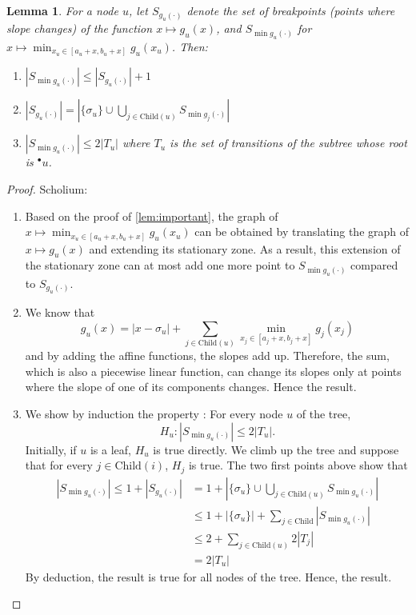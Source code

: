 \documentclass[conference]{IEEEtran}
\newtheorem{lemma}[theorem]{Lemma}
\begin{document}
\begin{lemma}\label{Encadrement}
For a node $u$, let $S_{g_{u}(\cdot)}$ denote the set of breakpoints (points where slope changes) of the function $x \mapsto g_{u}(x)$, and $S_{\min g_{u}(\cdot)}$ for $x \mapsto \min_{x_u \in [a_u+x, b_u+x]} g_{u}(x_u)$. Then:
\begin{enumerate}
    \item $|S_{\min g_{u}(\cdot)}| \leq |S_{g_{u}(\cdot)}|+1 $
    \item $|S_{g_{u}(\cdot)}| = |\{\sigma_u\}\cup \bigcup_{j\in\text{Child}(u)}S_{\min g_{j}(\cdot)}|$
    \item $|S_{\min g_{u}(\cdot)}| \leq 2|T_u|$ where $T_u$ is the set of transitions of the subtree whose root is ${}^\bullet u$.
\end{enumerate}
\end{lemma}

\begin{proof}
    Scholium:
    \begin{enumerate}
        \item Based on the proof of \autoref{lem:important}, the graph of 
        $x\mapsto\min_{x_u \in [a_u+x,b_u+x]}g_{u}(x_u)$ can be obtained by 
        translating the graph of $x\mapsto g_{u}(x)$ and extending its stationary 
        zone. As a result, this extension of the stationary zone can at most add 
        one more point to $S_{\min g_{u}(\cdot)}$ compared to $S_{g_{u}(\cdot)}$.
        \item We know that 
        \[g_{u}(x) = |x-\sigma_u| + \sum_{j\in \text{Child}(u)}\min_{x_j \in [a_j+x,b_j+x]}g_{j}(x_j)\] 
        and by adding the affine functions, the slopes add up. Therefore, the sum, 
        which is also a piecewise linear function, can change its slopes only at 
        points where the slope of one of its components changes. Hence the result.
        \item We show by induction the property : For every node $u$ of the 
        tree, \[H_u: |S_{\min g_{u}(\cdot)}| \leq 2|T_u|.\] 
        Initially, if $u$ is a leaf, $H_u$ is true directly. 
        We climb up the tree and suppose that for every 
        $j \in \text{Child}(i)$, $H_j$ is true. The two first points above show that
        \begin{equation}
            \begin{split}
                |S_{\min g_{u}(\cdot)}| \leq 1 + |S_{g_{u}(\cdot)}| 
                & = 1 + |\{\sigma_u\}\cup \bigcup_{j\in\text{Child}(u)}S_{\min g_{u}(\cdot)}| \\
                & \leq 1 + |\{\sigma_u\}| + \sum_{j\in\text{Child}} |S_{\min g_{u}(\cdot)}| \\
                & \leq 2 + \sum_{j\in\text{Child}(u)}2|T_j|\\
                & = 2|T_u|
            \end{split}
        \end{equation}
        By deduction, the result is true for all nodes of the tree. Hence, the result. 
    \end{enumerate}
\end{proof}
\end{document}
